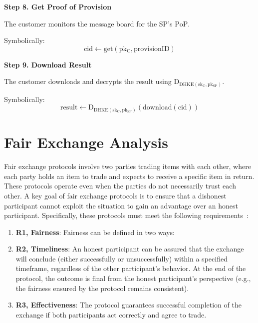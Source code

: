 \documentclass[pdftex,twocolumn,epjc3]{svjour3}
\begin{document}
\noindent \textbf{Step 8. Get Proof of Provision}\label{step-8-get-proof-of-provision}

The customer monitors the message board for the SP's $\mathrm{PoP}$.

Symbolically: 
\[
\mathrm{cid \gets get(pk_C, provisionID)}
\]

\noindent \textbf{Step 9. Download Result}\label{step-9-download-result}

The customer downloads and decrypts the $\mathrm{result}$ using $\mathrm{D_{DHKE(sk_C, pk_{SP})}}$.

Symbolically: 
\[
\mathrm{result \gets D_{DHKE(sk_C, pk_{SP})}(download(cid))}
\]

\section{Fair Exchange Analysis}\label{sec:fairness-analysis}

Fair exchange protocols involve two parties trading items with each other, where each party holds an item to trade and expects to receive a specific item in return. These protocols operate even when the parties do not necessarily trust each other. A key goal of fair exchange protocols is to ensure that a dishonest participant cannot exploit the situation to gain an advantage over an honest participant. Specifically, these protocols must meet the following requirements~\cite{asokanFairnessElectronicCommerce1998, liuFairnessCryptocurrencyPayments2018}:
\begin{enumerate}

    \item \textbf{R1, Fairness}: Fairness can be defined in two ways:


    \item \textbf{R2, Timeliness}: An honest participant can be assured that the exchange will conclude (either successfully or unsuccessfully) within a specified timeframe, regardless of the other participant's behavior. At the end of the protocol, the outcome is final from the honest participant's perspective (e.g., the fairness ensured by the protocol remains consistent).

    \item \textbf{R3, Effectiveness}: The protocol guarantees successful completion of the exchange if both participants act correctly and agree to trade.

\end{enumerate}    
\end{document}
